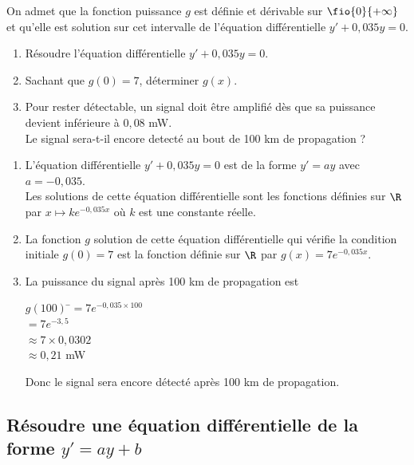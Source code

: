 \documentclass[a4paper,11pt,exos]{nsi} %
\begin{document}
On admet que la fonction puissance $g$ est définie et dérivable sur $\fio{0}{+\infty}$ et qu'elle est solution sur cet intervalle de l'équation différentielle $y'+0,035y=0$.

\begin{enumerate}
    \item Résoudre l'équation différentielle $y'+0,035y=0$.
    \item Sachant que $g(0)=7$, déterminer $g(x)$.
    \item Pour rester détectable, un signal doit être amplifié dès que sa puissance devient inférieure à $0,08$ mW.\\
    Le signal sera-t-il encore detecté au bout de 100 km de propagation ?
\end{enumerate}

\textcolor{UGLiBlue}{
    \begin{enumerate}
        \item L'équation différentielle $y'+0,035y=0$ est de la forme $y'=ay$ avec $a=-0,035$.\\
        Les solutions de cette équation différentielle sont les fonctions définies sur $\R$ par $x\mapsto ke^{-0,035x}$ où $k$ est une constante réelle.
        \item La fonction $g$ solution de cette équation différentielle qui vérifie la condition initiale $g(0)=7$ est la fonction définie sur $\R$ par $g(x)=7e^{-0,035x}$.
        \item La puissance du signal après 100 km de propagation est
        \begin{tabbing}
            $g(100)$ \=$=7e^{-0,035\times 100}$\\
            \> $=7e^{-3,5}$\\
            \> $\approx 7\times 0,0302$\\
            \> $\approx 0,21$ mW
        \end{tabbing}
        Donc le signal sera encore détecté après 100 km de propagation.
    \end{enumerate}
}

\subsection*{Résoudre une équation différentielle de la forme $y'=ay+b$}
\end{document}
